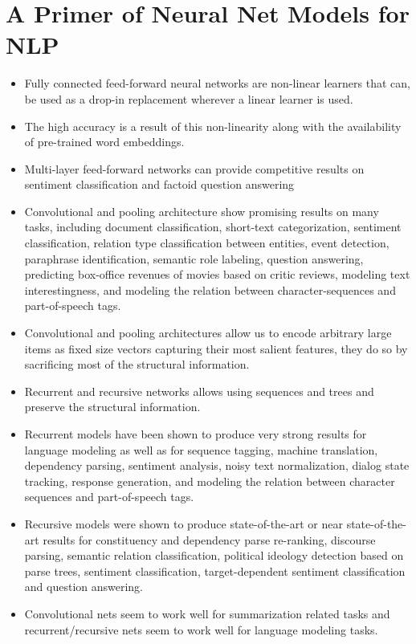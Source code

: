 \documentclass[11pt,a4paper]{article}
\begin{document}




\section{A Primer of Neural Net Models for NLP} %
\label{sec:a_primer_of_neural_net_models_for_nlp}

  \begin{itemize}
    \item 
    Fully connected feed-forward neural networks are non-linear learners that can, be used as a drop-in replacement wherever a linear learner is used.
    \item 
    The high accuracy is a result of this non-linearity along with the availability of pre-trained word embeddings.
    \item 
    Multi-layer feed-forward networks can provide competitive results on sentiment classification and factoid question answering
    \item 
    Convolutional and pooling architecture show promising results on many tasks, including document classification, short-text categorization, sentiment classification, relation type classification between entities, event detection, paraphrase identification, semantic role labeling, question answering, predicting box-office revenues of movies based on critic reviews, modeling text interestingness, and modeling the relation between character-sequences and part-of-speech tags.
    \item 
    Convolutional and pooling architectures allow us to encode arbitrary large items as fixed size vectors capturing their most salient features, they do so by sacrificing most of the structural information.
    \item 
    Recurrent and recursive networks allows using sequences and trees and preserve the structural information.
    \item 
    Recurrent models have been shown to produce very strong results for language modeling as well as for sequence tagging, machine translation, dependency parsing, sentiment analysis, noisy text normalization, dialog state tracking, response generation, and modeling the relation between character sequences and part-of-speech tags. 
    \item 
    Recursive models were shown to produce state-of-the-art or near state-of-the-art results for constituency and dependency parse re-ranking, discourse parsing, semantic relation classification, political ideology detection based on parse trees, sentiment classification, target-dependent sentiment classification and question answering.
    \item 
    Convolutional nets seem to work well for summarization related tasks and recurrent/recursive nets seem to work well for language modeling tasks.
  \end{itemize}
\end{document}
